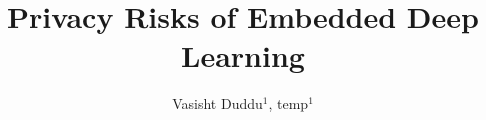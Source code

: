 \documentclass[sigconf]{acmart}
\begin{document}
\title{Privacy Risks of Embedded Deep Learning}

\author{Vasisht Duddu$^1$, temp$^1$}

\end{document}
